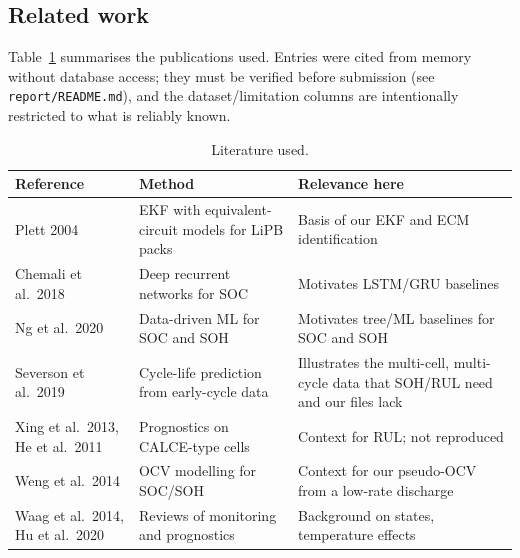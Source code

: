 \subsection{Related work}
Table~\ref{tab:lit} summarises the publications used. Entries were cited from memory without database access; they must be verified before submission (see \texttt{report/README.md}), and the dataset/limitation columns are intentionally restricted to what is reliably known.
\begin{table}[H]\centering\small
\begin{tabular}{p{2.3cm}p{4.6cm}p{6.6cm}}\toprule
Reference & Method & Relevance here\\\midrule
Plett 2004 \cite{plett2004ekf1,plett2004ekf2,plett2004ekf3} & EKF with equivalent-circuit models for LiPB packs & Basis of our EKF and ECM identification\\
Chemali et al.\ 2018 \cite{chemali2018} & Deep recurrent networks for SOC & Motivates LSTM/GRU baselines\\
Ng et al.\ 2020 \cite{ng2020} & Data-driven ML for SOC and SOH & Motivates tree/ML baselines for SOC and SOH\\
Severson et al.\ 2019 \cite{severson2019} & Cycle-life prediction from early-cycle data & Illustrates the multi-cell, multi-cycle data that SOH/RUL need and our files lack\\
Xing et al.\ 2013, He et al.\ 2011 \cite{xing2013,he2011} & Prognostics on CALCE-type cells & Context for RUL; not reproduced\\
Weng et al.\ 2014 \cite{weng2014} & OCV modelling for SOC/SOH & Context for our pseudo-OCV from a low-rate discharge\\
Waag et al.\ 2014, Hu et al.\ 2020 \cite{waag2014,hu2020joule} & Reviews of monitoring and prognostics & Background on states, temperature effects\\
\bottomrule\end{tabular}
\caption{Literature used.}\label{tab:lit}
\end{table}
